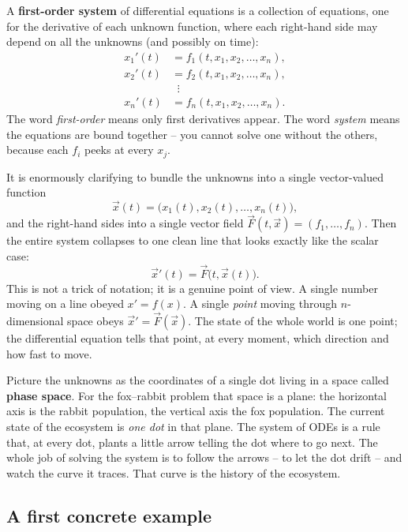 A \textbf{first-order system} of differential equations is a collection of
equations, one for the derivative of each unknown function, where each
right-hand side may depend on all the unknowns (and possibly on time):
\[
  \begin{aligned}
    x_1'(t) &= f_1(t, x_1, x_2, \dots, x_n),\\
    x_2'(t) &= f_2(t, x_1, x_2, \dots, x_n),\\
            &\;\;\vdots\\
    x_n'(t) &= f_n(t, x_1, x_2, \dots, x_n).
  \end{aligned}
\]
The word \emph{first-order} means only first derivatives appear. The word
\emph{system} means the equations are bound together -- you cannot solve one
without the others, because each $f_i$ peeks at every $x_j$.

It is enormously clarifying to bundle the unknowns into a single vector-valued
function
\[
  \vec{x}(t) = \big(x_1(t), x_2(t), \dots, x_n(t)\big),
\]
and the right-hand sides into a single vector field
$\vec{F}(t,\vec x) = (f_1, \dots, f_n)$. Then the entire system collapses to one
clean line that looks exactly like the scalar case:
\[
  \boxed{\;\vec{x}'(t) = \vec{F}\big(t, \vec{x}(t)\big).\;}
\]
This is not a trick of notation; it is a genuine point of view. A single number
moving on a line obeyed $x' = f(x)$. A single \emph{point} moving through
$n$-dimensional space obeys $\vec x' = \vec F(\vec x)$. The state of the whole
world is one point; the differential equation tells that point, at every moment,
which direction and how fast to move.

\begin{intuitionbox}
Picture the unknowns as the coordinates of a single dot living in a space called
\textbf{phase space}. For the fox--rabbit problem that space is a plane: the
horizontal axis is the rabbit population, the vertical axis the fox population.
The current state of the ecosystem is \emph{one dot} in that plane. The system of
ODEs is a rule that, at every dot, plants a little arrow telling the dot where to
go next. The whole job of solving the system is to follow the arrows -- to let
the dot drift -- and watch the curve it traces. That curve is the history of the
ecosystem.
\end{intuitionbox}

\subsection{A first concrete example}

